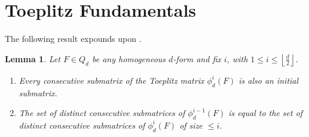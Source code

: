 \documentclass[unnumsec,webpdf,modern,medium]{oup-authoring-template}
\newcommand{\flo}[1]{\left\lfloor\frac{#1}{2}\right\rfloor}
\theoremstyle{theorem}
\newtheorem{lemma}[theorem]{Lemma}
\theoremstyle{definition}
\begin{document}
\section{Toeplitz Fundamentals}
\label{sec:Prelim}
The following result expounds upon \cite[Remark 4.17]{MMS}.
\begin{lemma}
	\label{lem:Properties}
	Let $F\in Q_d$ be any homogeneous $d$-form and fix $i$, with $1\leq i\leq \flo{d}$.
	\begin{enumerate}
		\item Every consecutive submatrix of the Toeplitz matrix $\phi^i_d(F)$ is also an initial submatrix.
		
		\item The set of distinct consecutive submatrices of $\phi^{i-1}_d(F)$ is equal to the set of distinct consecutive submatrices of $\phi^{i}_d(F)$ of size $\leq i$. 
	\end{enumerate}
\end{lemma}
\end{document}
